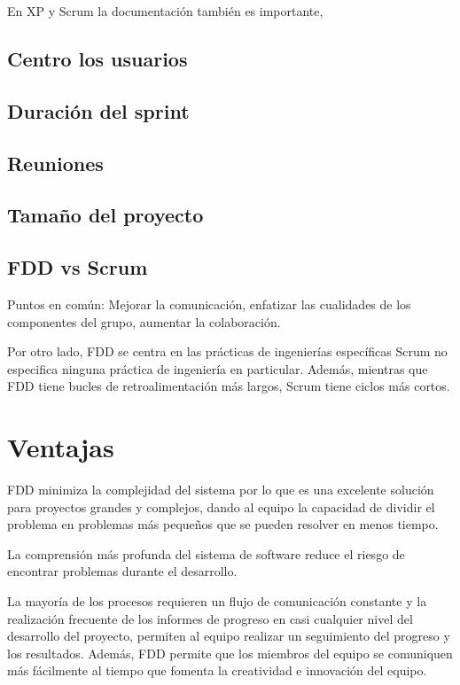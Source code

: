\documentclass[11pt]{article}
\begin{document}
En XP y Scrum la documentación también es importante, 
\subsection*{Centro los usuarios}
\subsection*{Duración del sprint}
\subsection*{Reuniones}
\subsection*{Tamaño del proyecto}


\subsection*{FDD vs Scrum}
Puntos en común: Mejorar la comunicación, enfatizar las cualidades de los componentes del grupo, aumentar la colaboración.

Por otro lado, FDD se centra en las prácticas de ingenierías específicas Scrum no especifica ninguna práctica de ingeniería en particular. Además, mientras que FDD tiene bucles de retroalimentación más largos, Scrum tiene ciclos más cortos.

\section{Ventajas}
FDD minimiza la complejidad del sistema por lo que es una excelente solución para proyectos grandes y complejos, dando al equipo la capacidad de dividir el problema en problemas más pequeños que se pueden resolver en menos tiempo.

La comprensión más profunda del sistema de software reduce el riesgo de encontrar problemas durante el desarrollo.

La mayoría de los procesos requieren un flujo de comunicación constante y la realización frecuente de los informes de progreso en casi cualquier nivel del desarrollo del proyecto, permiten al equipo realizar un seguimiento del progreso y los resultados. Además, FDD permite que los miembros del equipo se comuniquen más fácilmente al tiempo que fomenta la creatividad e innovación del equipo.
\end{document}
